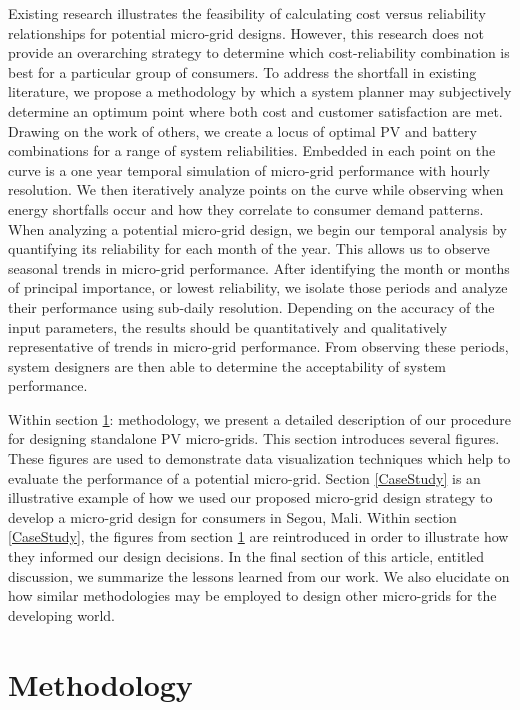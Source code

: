 \documentclass[11p]{article}
\begin{document}
Existing research illustrates the feasibility of calculating cost versus reliability relationships for potential micro-grid designs.
However, this research does not provide an overarching strategy to determine which cost-reliability combination is best for a particular group of consumers.  
To address the shortfall in existing literature, we propose a methodology by which a system planner may subjectively determine an optimum point where both cost and customer satisfaction are met.
Drawing on the work of others, we create a locus of optimal PV and battery combinations for a range of system reliabilities.
Embedded in each point on the curve is a one year temporal simulation of micro-grid performance with hourly resolution.  
We then iteratively analyze points on the curve while observing when energy shortfalls occur and how they correlate to consumer demand patterns.
When analyzing a potential micro-grid design, we begin our temporal analysis by quantifying its reliability for each month of the year. 
This allows us to observe seasonal trends in micro-grid performance. 
After identifying the month or months of principal importance, or lowest reliability, we isolate those periods and analyze their performance using sub-daily resolution. 
Depending on the accuracy of the input parameters, the results should be quantitatively and qualitatively representative of trends in micro-grid performance. 
From observing these periods, system designers are then able to determine the acceptability of system performance.


Within section \ref{method}: methodology, we present a detailed description of our procedure for designing standalone PV micro-grids. 
This section introduces several figures.
These figures are used to demonstrate data visualization techniques which help to evaluate the performance of a potential micro-grid.  
Section \ref{CaseStudy} is an illustrative example of how we used our proposed micro-grid design strategy to develop a micro-grid design for consumers in Segou, Mali. 
Within section \ref{CaseStudy}, the figures from section \ref{method} are reintroduced in order to illustrate how they informed our design decisions.
In the final section of this article, entitled discussion, we summarize the lessons learned from our work. 
We also elucidate on how similar methodologies may be employed to design other micro-grids for the developing world. 

\section{Methodology} \label{method}
\end{document}
